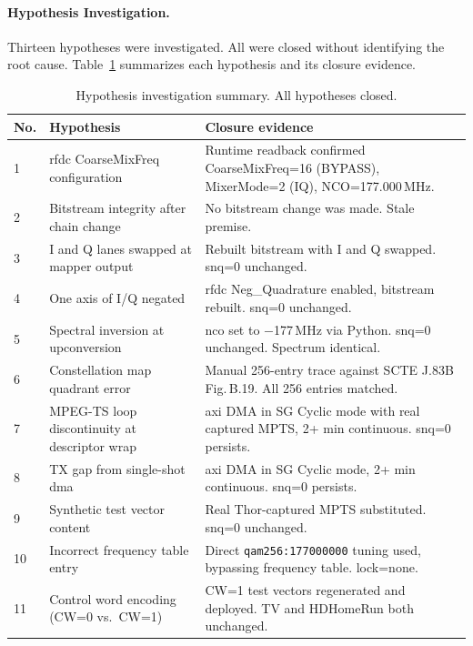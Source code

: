 \FloatBarrier
\paragraph{Hypothesis Investigation.}
\leavevmode\par

Thirteen hypotheses were investigated.
All were closed without identifying the root cause.
Table~\ref{tab:hypotheses} summarizes each hypothesis and its
closure evidence.

\begin{table}[htbp]
  \caption{Hypothesis investigation summary. All hypotheses closed.}
  \label{tab:hypotheses}
  \centering
  \footnotesize
  \begin{tabular}{lp{3.8cm}p{9.5cm}}
    \hline
    No. & Hypothesis & Closure evidence \\
    \hline
    1
      & \ac{rfdc} CoarseMixFreq configuration
      & Runtime readback confirmed CoarseMixFreq=16 (BYPASS),
        MixerMode=2 (IQ), NCO=177.000\,MHz. \\[4pt]
    2
      & Bitstream integrity after chain change
      & No bitstream change was made. Stale premise. \\[4pt]
    3
      & I and Q lanes swapped at mapper output
      & Rebuilt bitstream with I and Q swapped.
        snq=0 unchanged. \\[4pt]
    4
      & One axis of I/Q negated
      & \ac{rfdc} Neg\_Quadrature enabled, bitstream rebuilt.
        snq=0 unchanged. \\[4pt]
    5
      & Spectral inversion at upconversion
      & \ac{nco} set to $-$177\,MHz via Python.
        snq=0 unchanged. Spectrum identical. \\[4pt]
    6
      & Constellation map quadrant error
      & Manual 256-entry trace against SCTE J.83B Fig.\,B.19.
        All 256 entries matched. \\[4pt]
    7
      & MPEG-TS loop discontinuity at descriptor wrap
      & \ac{axi} DMA in SG Cyclic mode with real captured
        MPTS, 2+ min continuous. snq=0 persists. \\[4pt]
    8
      & TX gap from single-shot \ac{dma}
      & \ac{axi} DMA in SG Cyclic mode, 2+ min continuous.
        snq=0 persists. \\[4pt]
    9
      & Synthetic test vector content
      & Real Thor-captured MPTS substituted.
        snq=0 unchanged. \\[4pt]
    10
      & Incorrect frequency table entry
      & Direct \texttt{qam256:177000000} tuning used,
        bypassing frequency table. lock=none. \\[4pt]
    11
      & Control word encoding (CW=0 vs.\ CW=1)
      & CW=1 test vectors regenerated and deployed.
        TV and HDHomeRun both unchanged. \\
    \hline
  \end{tabular}
\end{table}

